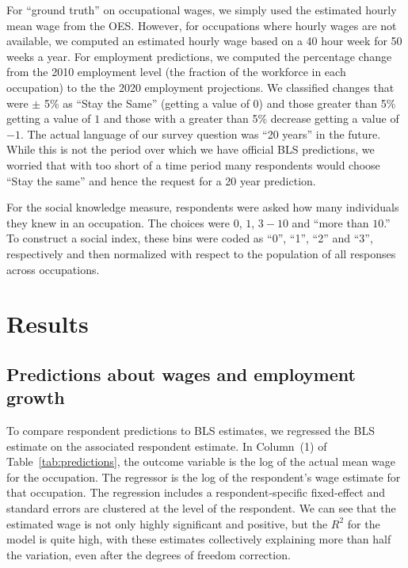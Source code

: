 \documentclass[12pt]{article}
\newcommand{\qu}[1]{``#1''}
\begin{document}
For ``ground truth'' on occupational wages, we simply used the estimated hourly mean wage from the OES.
However, for occupations where hourly wages are not available, we computed an estimated hourly wage based on a 40 hour week for 50 weeks a year.  
For employment predictions, we computed the percentage change from the 2010 employment level (the fraction of the workforce in each occupation) to the the 2020 employment projections. 
We classified changes that were $\pm$ 5\% as ``Stay the Same'' (getting a value of $0$) and those greater than 5\% getting a value of $1$ and those with a greater than 5\% decrease getting a value of $-1$.  
The actual language of our survey question was ``20 years'' in the future. 
While this is not the period over which we have official BLS predictions, we worried that with too short of a time period many respondents would choose ``Stay the same'' and hence the request for a 20 year prediction. 

For the social knowledge measure, respondents were asked how many individuals they knew in an occupation. 
The choices were $0$, $1$, $3-10$ and \qu{more than $10$.} 
To construct a social index, these bins were coded as ``0'', ``1'', ``2'' and ``3'', respectively and then normalized with respect to the population of all responses across occupations.


\section{Results}

\subsection{Predictions about wages and employment growth}

To compare respondent predictions to BLS estimates, we regressed the BLS estimate on the associated respondent estimate. 
In Column~(1) of Table~\ref{tab:predictions}, the outcome variable is the log of the actual mean wage for the occupation. 
The regressor is the log of the respondent's wage estimate for that occupation. 
The regression includes a respondent-specific fixed-effect and standard errors are clustered at the level of the respondent. 
We can see that the estimated wage is not only highly significant and positive, but the $R^2$ for the model is quite high, with these estimates collectively explaining more than half the variation, even after the degrees of freedom correction. 
\end{document}
